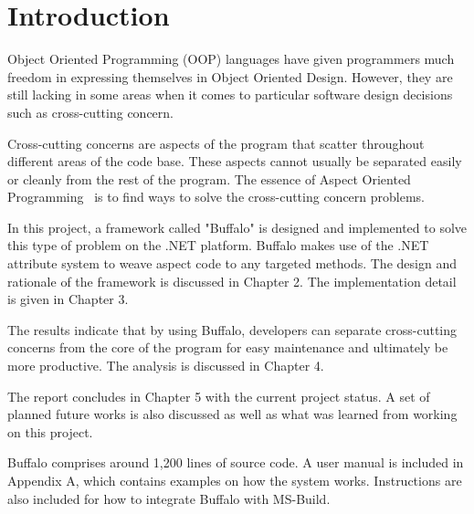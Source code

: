 \chapter{Introduction}

Object Oriented Programming (OOP) languages have given programmers much freedom in expressing themselves in Object Oriented Design. However, they are still lacking in some areas when it comes to particular software design decisions such as cross-cutting concern.

Cross-cutting concerns are aspects of the program that scatter throughout different areas of the code base. These aspects cannot usually be separated easily or cleanly from the rest of the program. The essence of Aspect Oriented Programming~\cite{aop} is to find ways to solve the cross-cutting concern problems.

In this project, a framework called "Buffalo" is designed and implemented to solve this type of problem on the .NET platform. Buffalo makes use of the .NET attribute system to weave aspect code to any targeted methods. The design and rationale of the framework is discussed in Chapter 2. The implementation detail is given in Chapter 3.

The results indicate that by using Buffalo, developers can separate cross-cutting concerns from the core of the program for easy maintenance and ultimately be more productive. The analysis is discussed in Chapter 4.

The report concludes in Chapter 5 with the current project status. A set of planned future works is also discussed as well as what was learned from working on this project.

Buffalo comprises around 1,200 lines of source code. A user manual is included in Appendix A, which contains examples on how the system works. Instructions are also included for how to integrate Buffalo with MS-Build.

